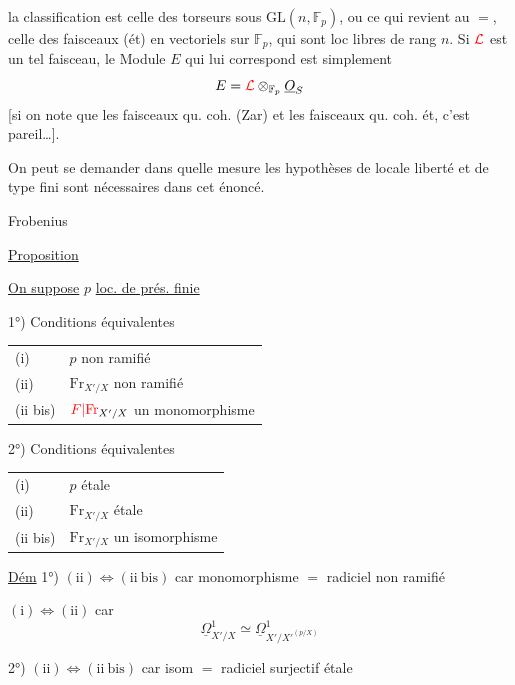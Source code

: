 la classification est celle des torseurs sous
$\mathrm{GL}(n,\mathbb F_p)$, ou ce qui revient au $=$, celle des
faisceaux (ét) en  vectoriels sur $\mathbb F_p$, qui
sont loc libres de rang $n$. Si ${\color{red}\mathcal L}$ est un
tel faisceau, le Module $E$ qui lui
correspond est simplement
\[
E={\color{red}\mathcal L}\otimes_{\mathbb F_p}\underline O_S
\]
[si on note que les faisceaux qu. coh.
(Zar) et les faisceaux qu. coh. ét,
c'est pareil\ldots].

On peut se demander dans quelle mesure les
hypothèses de locale liberté et de type fini sont
nécessaires dans cet énoncé.

Frobenius



\uline{Proposition}

\uline{On suppose} $p$ \uline{loc. de prés. finie}

1°) Conditions équivalentes

\begin{tabular}{ll}
(i) & $p$ non ramifié\\
(ii) & $\mathrm{Fr}_{X'/X}$ non ramifié\\
(ii bis) & ${\color{red}F|\mathrm{Fr}}_{X'/X}$ un monomorphisme
\end{tabular}

2°) Conditions équivalentes

\begin{tabular}{ll}
(i) & $p$ étale\\
(ii) & $\mathrm{Fr}_{X'/X}$ étale\\
(ii bis) & $\mathrm{Fr}_{X'/X}$ un isomorphisme
\end{tabular}

\uline{Dém} 1°) $(\mathrm{ii})\Longleftrightarrow(\mathrm{ii\ bis})$ car monomorphisme $=$ radiciel non ramifié

$(\mathrm{i})\Longleftrightarrow(\mathrm{ii})$ car
\[
\underline\Omega^1_{X'/X}\simeq\underline\Omega^1_{X'/X'^{(p/X)}}
\]

 2°) $(\mathrm{ii})\Longleftrightarrow(\mathrm{ii\ bis})$ car isom $=$ radiciel surjectif étale

